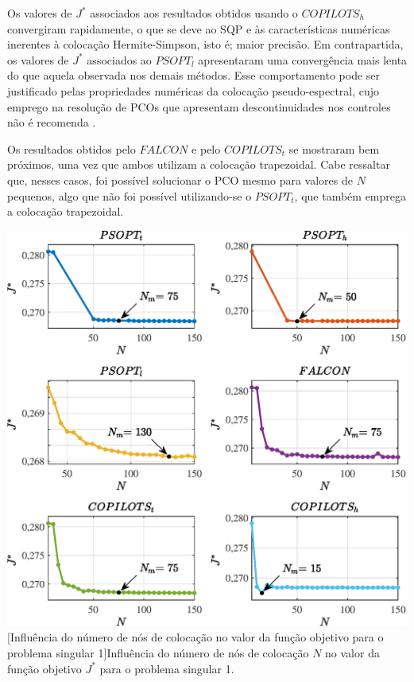 Os valores de $ J^* $ associados aos resultados obtidos usando o $ COPILOTS_h $ convergiram rapidamente, o que se deve ao SQP e às características numéricas inerentes à colocação Hermite-Simpson, isto é; maior precisão. Em contrapartida, os valores de $ J^* $ associados ao $ PSOPT_l $ apresentaram uma convergência mais lenta do que aquela observada nos demais métodos. Esse comportamento pode ser justificado pelas propriedades numéricas da colocação pseudo-espectral, cujo emprego na resolução de PCOs que apresentam descontinuidades nos controles não é recomenda \cite{becerra_tutorial_2010}.

Os resultados obtidos pelo $ FALCON $ e pelo $ COPILOTS_t $ se mostraram bem próximos, uma vez que ambos utilizam a colocação trapezoidal. Cabe ressaltar que, nesses casos, foi possível solucionar o PCO mesmo para valores de $ N $ pequenos, algo que não foi possível  utilizando-se o $ PSOPT_t $, que também emprega a colocação trapezoidal. 

\noindent	
\begin{minipage}{\textwidth}
	\vspace{\onelineskip}
	\centering
	\includegraphics[scale=0.7]{fig/resultados/singular1/sens/J}
	[Influência do número de nós de colocação no valor da função objetivo para o problema singular 1]{Influência do número de nós de colocação $ N $ no valor da função objetivo $ J^* $ para o problema singular 1.}
	\label{fig:singular1:sensibilidade:J}
	\vspace{\onelineskip}
\end{minipage}

